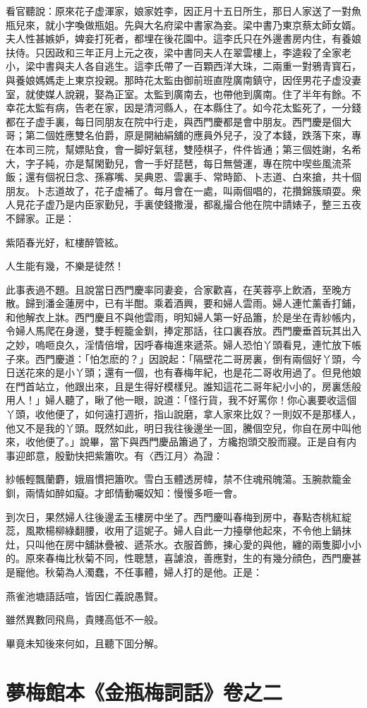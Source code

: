 看官聽說：原來花子虚渾家，娘家姓李，因正月十五日所生，那日人家送了一對魚瓶兒來，就小字喚做瓶姐。先與大名府梁中書家為妾。梁中書乃東京蔡太師女婿。夫人性甚嫉妒，婢妾打死者，都埋在後花園中。這李氏只在外邊書房内住，有養娘扶侍。只因政和三年正月上元之夜，梁中書同夫人在翠雲樓上，李逵殺了全家老小，梁中書與夫人各自逃生。這李氏帶了一百顆西洋大珠，二兩重一對鴉青寳石，與養娘媽媽走上東京投親。那時花太監由御前班直陞廣南鎮守，因侄男花子虚没妻室，就使媒人說親，娶為正室。太監到廣南去，也帶他到廣南。住了半年有餘。不幸花太監有病，告老在家，因是清河縣人，在本縣住了。如今花太監死了，一分錢都在子虚手裏，每日同朋友在院中行走，與西門慶都是會中朋友。西門慶是個大哥；第二個姓應雙名伯爵，原是開紬絹舖的應員外兒子，没了本錢，跌落下來，專在本司三院，幫嫖貼食，會一脚好氣毬，雙陸棋子，件件皆通；第三個姓謝，名希大，字子純，亦是幫閑勤兒，會一手好琵琶，每日無營運，專在院中喫些風流茶飯；還有個祝日念、孫寡嘴、吴典恩、雲裏手、常時節、卜志道、白來搶，共十個朋友。卜志道故了，花子虚補了。每月會在一處，叫兩個唱的，花攢錦簇頑耍。衆人見花子虚乃是内臣家勤兒，手裏使錢撒漫，都亂撮合他在院中請婊子，整三五夜不歸家。正是：

紫陌春光好，紅樓醉管絃。

人生能有幾，不樂是徒然！

此事表過不題。且說當日西門慶率同妻妾，合家歡喜，在芙蓉亭上飲酒，至晚方散。歸到潘金蓮房中，已有半酣。乘着酒興，要和婦人雲雨。婦人連忙薰香打鋪，和他解衣上牀。西門慶且不與他雲雨，明知婦人第一好品簫，於是坐在青紗帳内，令婦人馬爬在身邊，雙手輕籠金釧，捧定那話，往口裏吞放。西門慶垂首玩其出入之妙，嗚咂良久，淫情倍增，因呼春梅進來遞茶。婦人恐怕丫頭看見，連忙放下帳子來。西門慶道：「怕怎麽的？」因說起：「隔壁花二哥房裏，倒有兩個好丫頭，今日送花來的是小丫頭；還有一個，也有春梅年紀，也是花二哥收用過了。但見他娘在門首站立，他跟出來，且是生得好模樣兒。誰知這花二哥年紀小小的，房裏恁般用人！」婦人聽了，瞅了他一眼，說道：「怪行貨，我不好罵你！你心裏要收這個丫頭，收他便了，如何遠打週折，指山說磨，拿人家來比奴？一則奴不是那樣人，他又不是我的丫頭。既然如此，明日我往後邊坐一囬，騰個空兒，你自在房中叫他來，收他便了。」說畢，當下與西門慶品簫過了，方纔抱頭交股而寢。正是自有内事迎郎意，殷勤快把紫簫吹。有〈西江月〉為證：

紗帳輕飄蘭麝，娥眉慣把簫吹。雪白玉體透房幃，禁不住魂飛魄蕩。玉腕款籠金釧，兩情如醉如癡。才郎情動囑奴知：慢慢多咂一會。

到次日，果然婦人往後邊孟玉樓房中坐了。西門慶叫春梅到房中，春點杏桃紅綻蕊，風欺楊柳綠翻腰，收用了這妮子。婦人自此一力擡擧他起來，不令他上鍋抹灶，只叫他在房中舖牀疊被、遞茶水。衣服首飾，揀心愛的與他，纏的兩隻脚小小的。原來春梅比秋菊不同，性聰慧，喜謔浪，善應對，生的有幾分顔色，西門慶甚是寵他。秋菊為人濁蠢，不任事體，婦人打的是他。正是：

燕雀池塘語話喧，皆因仁義說愚賢。

雖然異數同飛鳥，貴賤高低不一般。

畢竟未知後來何如，且聽下囬分解。

\part*{夢梅館本《金瓶梅詞話》卷之二}

